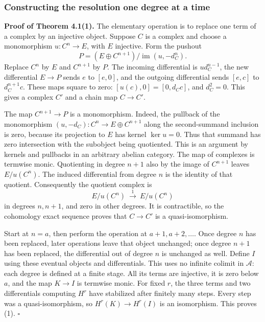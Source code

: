 \documentclass[
  english,
  11pt,
  a4paper,
]{article}
\begin{document}
\subsubsection{Constructing the resolution one degree at a
time}\label{injective-modules-and-bounded-below-derived-functors--constructing-the-resolution-one-degree-at-a-time}

\textbf{Proof of Theorem 4.1(1).} The elementary operation is to replace
one term of a complex by an injective object. Suppose \(C\) is a complex
and choose a monomorphism \(u:C^n\to E\), with \(E\) injective. Form the
pushout \[P=(E\oplus C^{n+1})/\operatorname{im}(u,-d_C^n).\] Replace
\(C^n\) by \(E\) and \(C^{n+1}\) by \(P\). The incoming differential is
\(u d_C^{n-1}\), the new differential \(E\to P\) sends \(e\) to
\([e,0]\), and the outgoing differential sends \([e,c]\) to
\(d_C^{n+1}c\). These maps square to zero: \([u(c),0]=[0,d_Cc]\), and
\(d_C^2=0\). This gives a complex \(C'\) and a chain map \(C\to C'\).

The map \(C^{n+1}\to P\) is a monomorphism. Indeed, the pullback of the
monomorphism \((u,-d_C):C^n\to E\oplus C^{n+1}\) along the
second-summand inclusion is zero, because its projection to \(E\) has
kernel \(\ker u=0\). Thus that summand has zero intersection with the
subobject being quotiented. This is an argument by kernels and pullbacks
in an arbitrary abelian category. The map of complexes is termwise
monic. Quotienting in degree \(n+1\) also by the image of \(C^{n+1}\)
leaves \(E/u(C^n)\). The induced differential from degree \(n\) is the
identity of that quotient. Consequently the quotient complex is
\[E/u(C^n)\ \xrightarrow{\ 1\ }\ E/u(C^n)\] in degrees \(n,n+1\), and
zero in other degrees. It is contractible, so the cohomology exact
sequence proves that \(C\to C'\) is a quasi-isomorphism.

Start at \(n=a\), then perform the operation at \(a+1,a+2,\ldots\). Once
degree \(n\) has been replaced, later operations leave that object
unchanged; once degree \(n+1\) has been replaced, the differential out
of degree \(n\) is unchanged as well. Define \(I\) using these eventual
objects and differentials. This uses no infinite colimit in
\(\mathcal A\): each degree is defined at a finite stage. All its terms
are injective, it is zero below \(a\), and the map \(K\to I\) is
termwise monic. For fixed \(r\), the three terms and two differentials
computing \(H^r\) have stabilized after finitely many steps. Every step
was a quasi-isomorphism, so \(H^r(K)\to H^r(I)\) is an isomorphism. This
proves (1). \(\square\)
\end{document}
